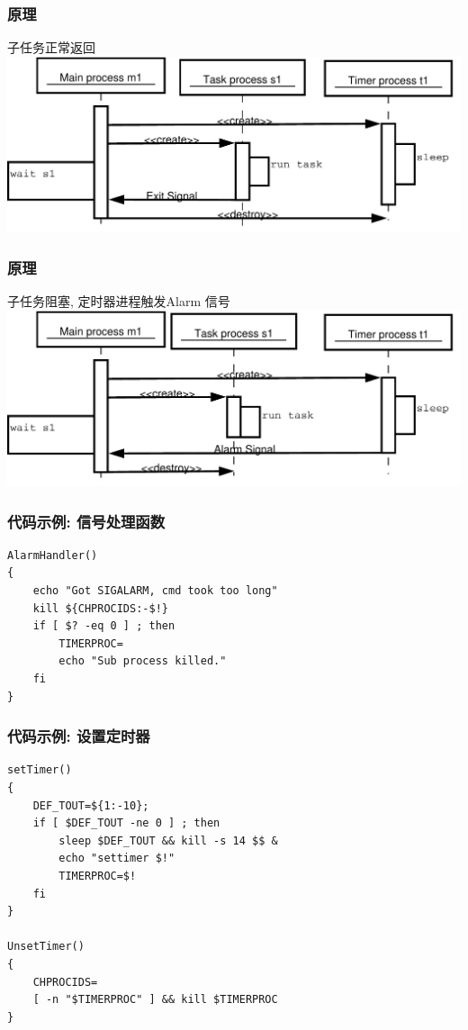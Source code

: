 \documentclass[compress]{beamer}
\begin{document}
\begin{frame}
\frametitle{原理}
子任务正常返回\\[2ex]
\includegraphics[width=1.0\hsize]{success.pdf}
\end{frame}

\begin{frame}
\frametitle{原理}
子任务阻塞, 定时器进程触发Alarm 信号\\[2ex]
\includegraphics[width=1.0\hsize]{trap.pdf}
\end{frame}

\begin{frame}[fragile]
  \frametitle{代码示例: 信号处理函数}

\begin{lstlisting}
AlarmHandler()
{
    echo "Got SIGALARM, cmd took too long"
    kill ${CHPROCIDS:-$!}
    if [ $? -eq 0 ] ; then
        TIMERPROC=
        echo "Sub process killed."
    fi
}
\end{lstlisting}
\end{frame}

\begin{frame}[fragile]
  \frametitle{代码示例: 设置定时器}

\begin{lstlisting}[firstnumber=last,lineskip=-0.01pt]
setTimer()
{
    DEF_TOUT=${1:-10};
    if [ $DEF_TOUT -ne 0 ] ; then
        sleep $DEF_TOUT && kill -s 14 $$ &
        echo "settimer $!"
        TIMERPROC=$!
    fi
}

UnsetTimer()
{
    CHPROCIDS=
    [ -n "$TIMERPROC" ] && kill $TIMERPROC
}
\end{lstlisting}
\end{frame}
\end{document}
